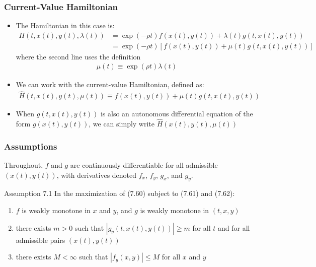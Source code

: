 \documentclass[9pt,aspectratio=169]{beamer}
\begin{document}
\begin{frame}
    \frametitle{Current-Value Hamiltonian}
    \begin{itemize}
        \item The Hamiltonian in this case is:
        \begin{align*}
            H(t, x(t), y(t), \lambda(t)) &= \exp(-\rho t)f(x(t), y(t)) +
            \lambda(t)g(t, x(t), y(t)) \\ 
            &= \exp(-\rho t)[f(x(t), y(t)) + \mu(t)g(t, x(t), y(t))]
        \end{align*}
        where the second line uses the definition
        \begin{align}
            \mu(t) \equiv \exp(\rho t)\lambda(t) \tag{7.63}
        \end{align}
        \item We can work with the current-value Hamiltonian, defined as:
        \begin{align}
            \hat{H}(t, x(t), y(t), \mu(t)) \equiv f(x(t), y(t)) + \mu(t)g(t,
            x(t), y(t)) \tag{7.64} 
        \end{align}
        \item When $g(t, x(t), y(t))$ is also an autonomous differential
        equation of the form $g(x(t), y(t))$, we can simply write
        $\hat{H}(x(t), y(t), \mu(t))$ 
    \end{itemize}
\end{frame}

\begin{frame}
\frametitle{Assumptions}

Throughout, $f$ and $g$ are continuously differentiable for all admissible
$(x(t), y(t))$, with derivatives denoted $f_x$, $f_y$, $g_x$, and $g_y$.
\begin{block}{Assumption 7.1}
    In the maximization of (7.60) subject to (7.61) and (7.62):
    \begin{enumerate}
        \item $f$ is weakly monotone in $x$ and $y$, and $g$ is weakly
        monotone in $(t, x, y)$ 
        \item there exists $m > 0$ such that $|g_y(t, x(t), y(t))| \geq m$
        for all $t$ and for all admissible pairs $(x(t), y(t))$
        \item there exists $M < \infty$ such that $|f_y(x, y)| \leq M$ for
        all $x$ and $y$
    \end{enumerate}
\end{block}
\end{frame}
\end{document}
